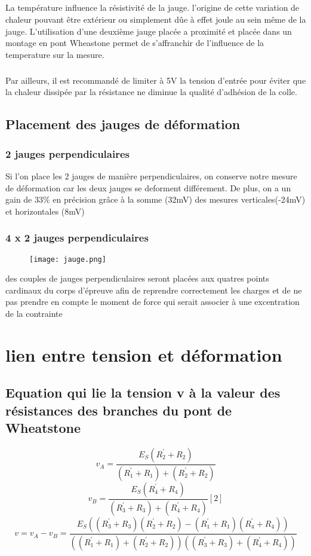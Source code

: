 \documentclass[10pt,a4paper]{report}
\begin{document}
\paragraph{}La température influence la résistivité de la jauge. l'origine de cette variation de chaleur pouvant être extérieur ou simplement dûe à effet joule au sein même de la jauge. L'utilisation d'une deuxième jauge placée a proximité et placée dans un montage en pont Wheastone permet de s'affranchir de l'influence de la temperature sur la mesure.
\paragraph{}Par ailleurs, il est recommandé de limiter à 5V la tension d'entrée pour éviter que la chaleur dissipée par la résistance ne diminue la qualité d'adhésion de la colle.
\section{Placement des jauges de déformation}
\subsection{2 jauges perpendiculaires}
Si l'on place les 2 jauges de manière perpendiculaires, on conserve notre mesure de déformation car les deux jauges se deforment différement. De plus, on a un gain de 33\% en précision grâce à la somme (32mV) des mesures verticales(-24mV) et horizontales (8mV)
\subsection{4 x 2 jauges perpendiculaires}
\begin{figure}
\texttt{[image: jauge.png]} 
\end{figure}
des couples de jauges perpendiculaires seront placées aux quatres points cardinaux du corps d'épreuve afin de reprendre correctement les charges et de ne pas prendre en compte le moment de force qui serait associer à une excentration de la contrainte
\chapter{lien entre tension et déformation}
\section*{Equation  qui lie la tension v à la valeur des résistances des branches du pont de Wheatstone}
\begin{equation}v_{A} = \dfrac{E_{S}(R^{'}_{2}+R_{2})}{(R^{'}_{1}+R_{1})+(R^{'}_{2}+R_{2})}\end{equation} 
\begin{equation}v_{B} = \dfrac{E_{S}(R^{'}_{4}+R_{4})}{(R^{'}_{3}+R_{3})+(R^{'}_{4}+R_{4})} [2]\end{equation} 
\begin{equation}
v = v_{A} - v_{B} = \dfrac{E_{S}((R^{'}_{3}+R_{3})(R^{'}_{2}+R_{2})-(R^{'}_{1}+R_{1})(R^{'}_{4}+R_{4}))}{((R^{'}_{1}+R_{1})+(R^{'}_{2}+R_{2}))((R^{'}_{3}+R_{3})+(R^{'}_{4}+R_{4}))} \end{equation} 
\end{document}
